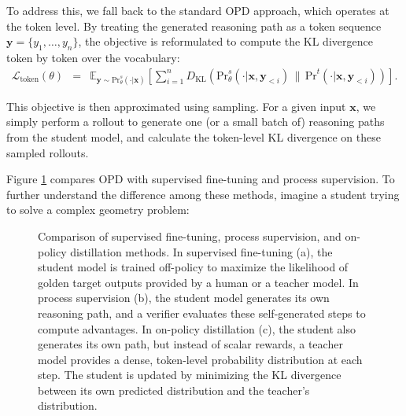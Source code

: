 To address this, we fall back to the standard OPD approach, which operates at the token level. By treating the generated reasoning path as a token sequence $\mathbf{y} = \{y_1,\dots, y_n\}$, the objective is reformulated to compute the KL divergence token by token over the vocabulary:
\begin{eqnarray}
\mathcal{L}_{\mathrm{token}}(\theta) & = & \mathbb{E}_{\mathbf{y} \sim \mathrm{Pr}_{\theta}^{s}(\cdot|\mathbf{x})} \left[ \sum_{i=1}^{n} D_{\mathrm{KL}} \left( \mathrm{Pr}_{\theta}^{s}(\cdot | \mathbf{x}, \mathbf{y}_{<i}) \,\|\, \mathrm{Pr}^{t}(\cdot | \mathbf{x}, \mathbf{y}_{<i}) \right) \right].
\end{eqnarray}

\noindent This objective is then approximated using sampling. For a given input $\mathbf{x}$, we simply perform a rollout to generate one (or a small batch of) reasoning paths from the student model, and calculate the token-level KL divergence on these sampled rollouts.

Figure \ref{fig:comparision-of-sft-ps-opd} compares OPD with supervised fine-tuning and process supervision. To further understand the difference among these methods, imagine a student trying to solve a complex geometry problem:

\begin{figure}[!t]
\centering

\caption{Comparison of supervised fine-tuning, process supervision, and on-policy distillation methods. In supervised fine-tuning (a), the student model is trained off-policy to maximize the likelihood of golden target outputs provided by a human or a teacher model. In process supervision (b), the student model generates its own reasoning path, and a verifier evaluates these self-generated steps to compute advantages. In on-policy distillation (c), the student also generates its own path, but instead of scalar rewards, a teacher model provides a dense, token-level probability distribution at each step. The student is updated by minimizing the KL divergence between its own predicted distribution and the teacher's distribution.}
\label{fig:comparision-of-sft-ps-opd}
\end{figure}

